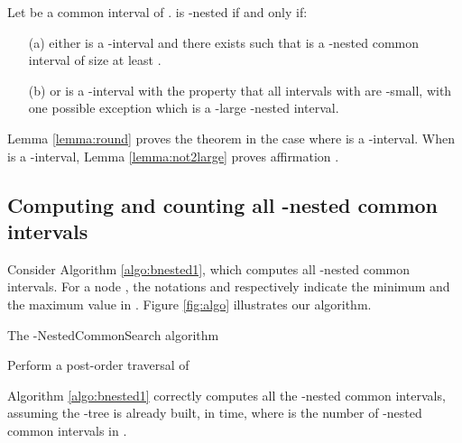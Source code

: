 \documentclass{article}
\begin{document}
\begin{theorem}\label{th:all}
Let  be a common  interval of .   is -nested if and only if:
\begin{enumerate}
\item[(a)] either  is a -interval and there exists  such that  is a -nested 
common  interval of size at least .
\item[(b)] or  is a -interval with the property that all intervals  with  are
 -small, with one possible exception which is a -large -nested interval. 

\end{enumerate}
\end{theorem}

\begin{preuve}
Lemma \ref{lemma:round} proves the theorem in the case where  is a -interval. When
 is a -interval, Lemma \ref{lemma:not2large} proves affirmation .\end{preuve}


\subsection{Computing and counting all -nested common intervals}\label{sect:algo}

Consider Algorithm \ref{algo:bnested1}, which computes all -nested common intervals. 
For a node , the  notations  and  respectively indicate the minimum and the maximum 
value in .
Figure \ref{fig:algo} illustrates our algorithm.

\begin{algorithm}[h]
\label{algo:bnested1}
\dontprintsemicolon
\caption{The -NestedCommonSearch algorithm}
Perform a post-order traversal of  \;

\end{algorithm}

\begin{theorem}

Algorithm \ref{algo:bnested1} correctly computes all the -nested common  intervals,
assuming the -tree is already built, in  time, where  is the
number of -nested common intervals in .
\end{theorem}
\end{document}
